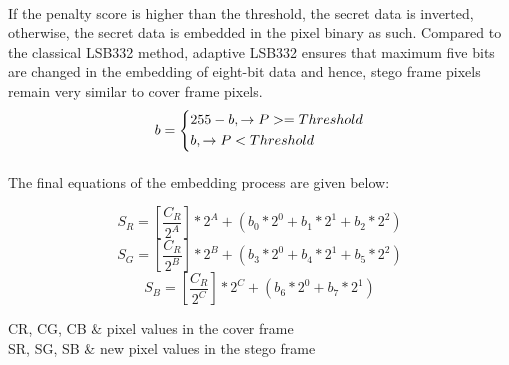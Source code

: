 {{        \paragraph{} If the penalty score is higher than the threshold, the secret data is inverted, otherwise, the secret data is embedded in the pixel binary as such. Compared to the classical LSB332 method, adaptive LSB332 ensures that maximum five bits are changed in the embedding of eight-bit data and hence, stego frame pixels remain very similar to cover frame pixels.
        \begin{equation}
            b = \begin{dcases}
                255-b, \to P >= Threshold\\
                b, \to P < Threshold
            \end{dcases}
        \end{equation}
        
        \paragraph{} The final equations of the embedding process are given below:
    }
    \begin{equation}
        S_R = [\frac{C_R}{2^A}] * 2^A + (b_0 * 2^0 + b_1 * 2^1 + b_2 * 2^2)
    \end{equation}
    \begin{equation}
        S_G = [\frac{C_R}{2^B}] * 2^B + (b_3 * 2^0 + b_4 * 2^1 + b_5 * 2^2)
    \end{equation}
    \begin{equation}
        S_B = [\frac{C_R}{2^C}] * 2^C + (b_6 * 2^0 + b_7 * 2^1)
    \end{equation}
    \begin{conditions}
        CR, CG, CB & pixel values in the cover frame\\
        SR, SG, SB & new pixel values in the stego frame
    \end{conditions}
}

